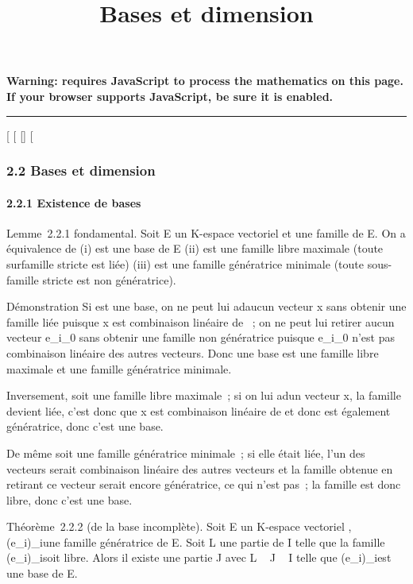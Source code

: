 \documentclass[]{article}
\title{Bases et dimension}
\author{}
\date{}
\begin{document}
\maketitle

\textbf{Warning: 
requires JavaScript to process the mathematics on this page.\\ If your
browser supports JavaScript, be sure it is enabled.}

\begin{center}\rule{3in}{0.4pt}\end{center}

{[}
{[}
{[}{]}
{[}

\subsubsection{2.2 Bases et dimension}

\paragraph{2.2.1 Existence de bases}

Lemme~2.2.1 fondamental. Soit E un K-espace vectoriel et  une famille
de E. On a équivalence de (i)  est une base de E (ii)  est une famille
libre maximale (toute surfamille stricte est liée) (iii)  est une
famille génératrice minimale (toute sous-famille stricte est non
génératrice).

Démonstration Si  est une base, on ne peut lui ad\jmathoindre aucun vecteur
x sans obtenir une famille liée puisque x est combinaison linéaire de
~; on ne peut lui retirer aucun vecteur e\_i\_0 sans
obtenir une famille non génératrice puisque e\_i\_0
n'est pas combinaison linéaire des autres vecteurs. Donc une base est
une famille libre maximale et une famille génératrice minimale.

Inversement, soit  une famille libre maximale~; si on lui ad\jmathoint un
vecteur x, la famille devient liée, c'est donc que x est combinaison
linéaire de  et donc  est également génératrice, donc c'est une base.

De même soit  une famille génératrice minimale~; si elle était liée,
l'un des vecteurs serait combinaison linéaire des autres vecteurs et la
famille obtenue en retirant ce vecteur serait encore génératrice, ce qui
n'est pas~; la famille est donc libre, donc c'est une base.

Théorème~2.2.2 (de la base incomplète). Soit E un K-espace vectoriel ,
(e\_i)\_i\inI une famille génératrice de E. Soit L une
partie de I telle que la famille (e\_i)\_i\inL soit libre.
Alors il existe une partie J avec L \subset~ J \subset~ I telle que
(e\_i)\_i\inJ est une base de E.
\end{document}
